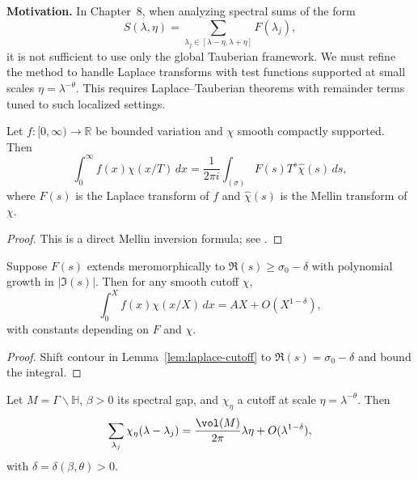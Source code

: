 \noindent \textbf{Motivation.}  
In Chapter~8, when analyzing spectral sums of the form
\[
S(\lambda,\eta) = \sum_{\lambda_j\in[\lambda-\eta,\lambda+\eta]} F(\lambda_j),
\]
it is not sufficient to use only the global Tauberian framework.  
We must refine the method to handle Laplace transforms with test functions supported at small scales $\eta=\lambda^{-\theta}$.  
This requires Laplace–Tauberian theorems with remainder terms tuned to such localized settings.

\medskip

\begin{lemma}\label{lem:laplace-cutoff}
Let $f:[0,\infty)\to \mathbb R$ be bounded variation and $\chi$ smooth compactly supported. Then
\[
\int_0^\infty f(x)\chi(x/T)\,dx
= \frac{1}{2\pi i} \int_{(\sigma)} F(s) T^s \widehat{\chi}(s)\,ds,
\]
where $F(s)$ is the Laplace transform of $f$ and $\widehat{\chi}(s)$ is the Mellin transform of $\chi$.  
\end{lemma}

\begin{proof}
This is a direct Mellin inversion formula; see \cite[Chap.~II]{Korevaar2004}.  
\end{proof}

\medskip

\begin{lemma}\label{lem:laplace-quant}
Suppose $F(s)$ extends meromorphically to $\Re(s)\ge \sigma_0-\delta$ with polynomial growth in $|\Im(s)|$.  
Then for any smooth cutoff $\chi$,
\[
\int_0^X f(x)\chi(x/X)\,dx = A X + O(X^{1-\delta}),
\]
with constants depending on $F$ and $\chi$.  
\end{lemma}

\begin{proof}
Shift contour in Lemma~\ref{lem:laplace-cutoff} to $\Re(s)=\sigma_0-\delta$ and bound the integral.  
\end{proof}

\medskip

\begin{proposition}\label{prop:localized-tauber}
Let $M=\Gamma\backslash \mathbb H$, $\beta>0$ its spectral gap, and $\chi_\eta$ a cutoff at scale $\eta=\lambda^{-\theta}$.  
Then
\[
\sum_{\lambda_j} \chi_\eta(\lambda-\lambda_j) = \frac{\vol(M)}{2\pi}\lambda \eta + O(\lambda^{1-\delta}),
\]
with $\delta=\delta(\beta,\theta)>0$.  
\end{proposition}

